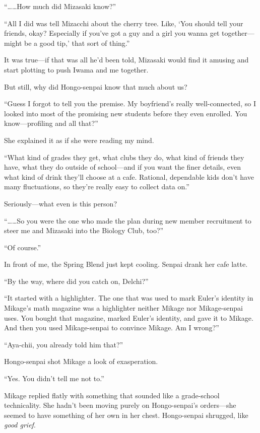 \documentclass[
    a4paper,
    12pt,
    twoside,
    openany,
    UTF8,
    fontset=windows
]{ctexbook}
\begin{document}
``\dots\dots How much did Mizasaki know?''

``All I did was tell Mizacchi about the cherry tree. Like, `You should tell your friends, okay? Especially if you've got a guy and a girl you wanna get together---might be a good tip,' that sort of thing.''

It was true---if that was all he'd been told, Mizasaki would find it amusing and start plotting to push Iwama and me together.

But still, why did Hongo-senpai know that much about us?

``Guess I forgot to tell you the premise. My boyfriend's really well-connected, so I looked into most of the promising new students before they even enrolled. You know---profiling and all that?''

She explained it as if she were reading my mind.

``What kind of grades they get, what clubs they do, what kind of friends they have, what they do outside of school---and if you want the finer details, even what kind of drink they'll choose at a cafe. Rational, dependable kids don't have many fluctuations, so they're really easy to collect data on.''

Seriously---what even is this person?

``\dots\dots So you were the one who made the plan during new member recruitment to steer me and Mizasaki into the Biology Club, too?''

``Of course.''

In front of me, the Spring Blend just kept cooling. Senpai drank her cafe latte.

``By the way, where did you catch on, Delchi?''

``It started with a highlighter. The one that was used to mark Euler's identity in Mikage's math magazine was a highlighter neither Mikage nor Mikage-senpai uses. You bought that magazine, marked Euler's identity, and gave it to Mikage. And then you used Mikage-senpai to convince Mikage. Am I wrong?''

``Aya-chii, you already told him that?''

Hongo-senpai shot Mikage a look of exasperation.

``Yes. You didn't tell me not to.''

Mikage replied flatly with something that sounded like a grade-school technicality. She hadn't been moving purely on Hongo-senpai's orders---she seemed to have something of her own in her chest. Hongo-senpai shrugged, like \textit{good grief}.
\end{document}
